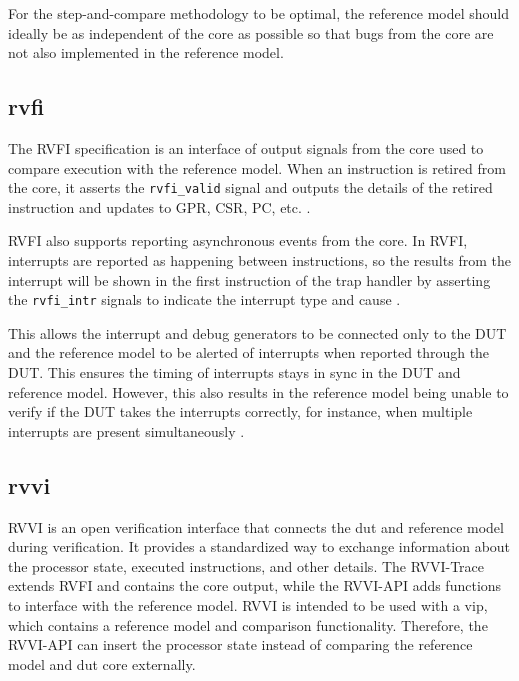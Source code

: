 For the step-and-compare methodology to be optimal, the reference model should ideally be as independent of the core as possible so that bugs from the core are not also implemented in the reference model.

\subsection{\acrfull{rvfi}}
\label{sec:rvfi}

The RVFI specification is an interface of output signals from the core used to compare execution with the reference model. 
When an instruction is retired from the core, it asserts the \lstinline{rvfi_valid} signal and outputs the details of the retired instruction and updates to GPR, CSR, PC, etc. \cite{symbioticedaRiscvformalDocsRvfi2020}.

RVFI also supports reporting asynchronous events from the core. In RVFI, interrupts are reported as happening between instructions, so the results from the interrupt will be shown in the first instruction of the trap handler by asserting the \lstinline{rvfi_intr} signals to indicate the interrupt type and cause \cite{openhwgroupRISCVFormalInterface2023}.

This allows the interrupt and debug generators to be connected only to the DUT and the reference model to be alerted of interrupts when reported through the DUT.
This ensures the timing of interrupts stays in sync in the DUT and reference model. However, this also results in the reference model being unable to verify if the DUT takes the interrupts correctly, for instance, when multiple interrupts are present simultaneously \cite{taylorAdvancedRISCVVerification2023}.




\subsection{\acrfull{rvvi}}
\label{sec:rvvi}

RVVI \cite{riscv-verificationRISCVVerificationInterface2023} is an open verification interface that connects the \acrfull{dut} and reference model during verification. It provides a standardized way to exchange information about the processor state, executed instructions, and other details. The RVVI-Trace extends RVFI and contains the core output, while the RVVI-API adds functions to interface with the reference model. RVVI is intended to be used with a \acrshort{vip}, which contains a reference model and comparison functionality. Therefore, the RVVI-API can insert the processor state instead of comparing the reference model and \acrshort{dut} core externally.

